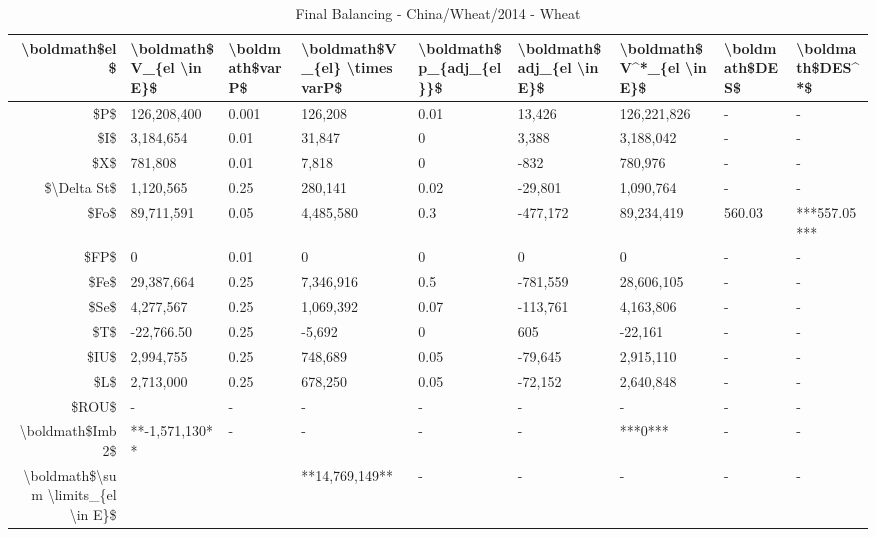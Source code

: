 \documentclass[]{article}
\begin{document}
\begin{table}

\caption{\label{tab:t22}Final Balancing - China/Wheat/2014 - Wheat}
\centering
\begin{tabular}[t]{r|l|l|l|l|l|l|l|l}
\hline
\textbackslash{}boldmath\$el\$ & \textbackslash{}boldmath\$V\_\{el \textbackslash{}in E\}\$ & \textbackslash{}boldmath\$varP\$ & \textbackslash{}boldmath\$V\_\{el\} \textbackslash{}times varP\$ & \textbackslash{}boldmath\$p\_\{adj\_\{el\}\}\$ & \textbackslash{}boldmath\$adj\_\{el \textbackslash{}in E\}\$ & \textbackslash{}boldmath\$V\textasciicircum{}*\_\{el \textbackslash{}in E\}\$ & \textbackslash{}boldmath\$DES\$ & \textbackslash{}boldmath\$DES\textasciicircum{}*\$\\
\hline
\$P\$ & 126,208,400 & 0.001 & 126,208 & 0.01 & 13,426 & 126,221,826 & - & -\\
\hline
\$I\$ & 3,184,654 & 0.01 & 31,847 & 0 & 3,388 & 3,188,042 & - & -\\
\hline
\$X\$ & 781,808 & 0.01 & 7,818 & 0 & -832 & 780,976 & - & -\\
\hline
\$\textbackslash{}Delta St\$ & 1,120,565 & 0.25 & 280,141 & 0.02 & -29,801 & 1,090,764 & - & -\\
\hline
\$Fo\$ & 89,711,591 & 0.05 & 4,485,580 & 0.3 & -477,172 & 89,234,419 & 560.03 & ***557.05***\\
\hline
\$FP\$ & 0 & 0.01 & 0 & 0 & 0 & 0 & - & -\\
\hline
\$Fe\$ & 29,387,664 & 0.25 & 7,346,916 & 0.5 & -781,559 & 28,606,105 & - & -\\
\hline
\$Se\$ & 4,277,567 & 0.25 & 1,069,392 & 0.07 & -113,761 & 4,163,806 & - & -\\
\hline
\$T\$ & -22,766.50 & 0.25 & -5,692 & 0 & 605 & -22,161 & - & -\\
\hline
\$IU\$ & 2,994,755 & 0.25 & 748,689 & 0.05 & -79,645 & 2,915,110 & - & -\\
\hline
\$L\$ & 2,713,000 & 0.25 & 678,250 & 0.05 & -72,152 & 2,640,848 & - & -\\
\hline
\$ROU\$ & - & - & - & - & - & - & - & -\\
\hline
\textbackslash{}boldmath\$Imb2\$ & **-1,571,130** & - & - & - & - & ***0*** & - & -\\
\hline
\textbackslash{}boldmath\$\textbackslash{}sum \textbackslash{}limits\_\{el \textbackslash{}in E\}\$ &  &  & **14,769,149** & - & - & - & - & -\\
\hline
\end{tabular}
\end{table}
\end{document}
